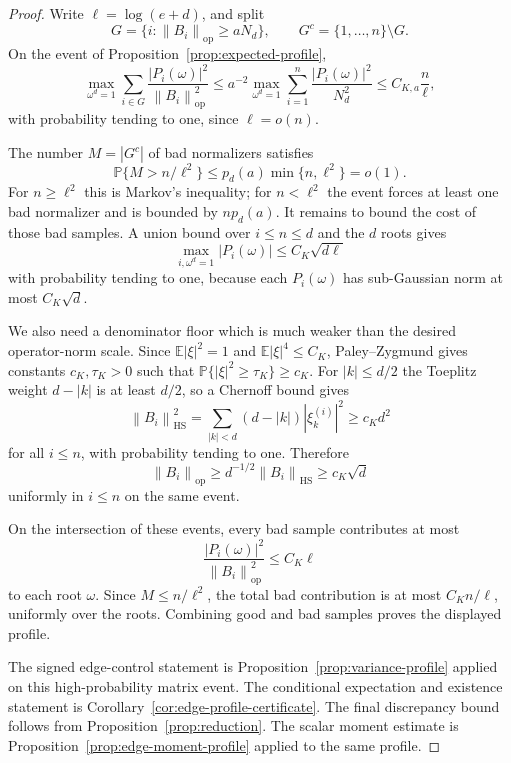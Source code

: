 \documentclass[11pt]{amsart}
\numberwithin{equation}{section}
\theoremstyle{definition}
\theoremstyle{remark}
\newcommand{\op}{\mathrm{op}}
\newcommand{\HS}{\mathrm{HS}}
\newcommand{\Prob}{\mathbb P}
\newcommand{\Exp}{\mathbb E}
\newcommand{\norm}[1]{\left\lVert #1\right\rVert}
\newcommand{\abs}[1]{\left\lvert #1\right\rvert}
\begin{document}
\begin{proof}
Write \(\ell=\log(e+d)\), and split
\[
  G=\{i:\norm{B_i}_{\op}\ge aN_d\},\qquad G^c=\{1,\ldots,n\}\setminus G .
\]
On the event of Proposition~\ref{prop:expected-profile},
\[
  \max_{\omega^d=1}\sum_{i\in G}
  \frac{\abs{P_i(\omega)}^2}{\norm{B_i}_{\op}^2}
  \le a^{-2}\max_{\omega^d=1}\sum_{i=1}^n
  \frac{\abs{P_i(\omega)}^2}{N_d^2}
  \le C_{K,a}\frac n\ell ,
\]
with probability tending to one, since \(\ell=o(n)\).

The number \(M=\abs{G^c}\) of bad normalizers satisfies
\[
  \Prob\{M>n/\ell^2\}\le p_d(a)\min\{n,\ell^2\}=o(1).
\]
For \(n\ge\ell^2\) this is Markov's inequality; for \(n<\ell^2\) the event
forces at least one bad normalizer and is bounded by \(np_d(a)\).
It remains to bound the cost of those bad samples.  A union bound over
\(i\le n\le d\) and the \(d\) roots gives
\[
  \max_{i,\omega^d=1}\abs{P_i(\omega)}
  \le C_K\sqrt{d\ell}
\]
with probability tending to one, because each \(P_i(\omega)\) has
sub-Gaussian norm at most \(C_K\sqrt d\).

We also need a denominator floor which is much weaker than the desired
operator-norm scale.  Since \(\Exp\abs{\xi}^2=1\) and
\(\Exp\abs{\xi}^4\le C_K\), Paley--Zygmund gives constants \(c_K,\tau_K>0\)
such that \(\Prob\{\abs{\xi}^2\ge\tau_K\}\ge c_K\).  For \(\abs{k}\le d/2\)
the Toeplitz weight \(d-\abs{k}\) is at least \(d/2\), so a Chernoff bound gives
\[
  \norm{B_i}_{\HS}^2
  =\sum_{\abs k<d}(d-\abs k)\abs{\xi_k^{(i)}}^2
  \ge c_K d^2
\]
for all \(i\le n\), with probability tending to one.  Therefore
\[
  \norm{B_i}_{\op}\ge d^{-1/2}\norm{B_i}_{\HS}\ge c_K\sqrt d
\]
uniformly in \(i\le n\) on the same event.

On the intersection of these events, every bad sample contributes at most
\[
  \frac{\abs{P_i(\omega)}^2}{\norm{B_i}_{\op}^2}\le C_K\ell
\]
to each root \(\omega\).  Since \(M\le n/\ell^2\), the total bad contribution is
at most \(C_K n/\ell\), uniformly over the roots.  Combining good and bad
samples proves the displayed profile.

The signed edge-control statement is Proposition~\ref{prop:variance-profile}
applied on this high-probability matrix event.  The conditional expectation and
existence statement is Corollary~\ref{cor:edge-profile-certificate}.  The final
discrepancy bound follows from Proposition~\ref{prop:reduction}.
The scalar moment estimate is Proposition~\ref{prop:edge-moment-profile}
applied to the same profile.
\end{proof}
\end{document}
